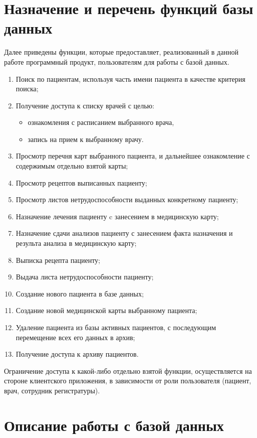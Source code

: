 \documentclass[14pt,a4paper,russian]{extreport}
\begin{document}
\section{Назначение и перечень функций базы данных}
Далее приведены функции, которые предоставляет, реализованный в данной работе программный продукт, пользователям для работы с базой данных.
\begin{enumerate}
	\item Поиск по пациентам, используя часть имени пациента в качестве критерия поиска;
	\item Получение доступа к списку врачей с целью:
		\begin{itemize}
				\renewcommand\labelitemi{--}
			\item ознакомления с расписанием выбранного врача,
			\item запись на прием к выбранному врачу.
		\end{itemize}
	\item Просмотр перечня карт выбранного пациента, и дальнейшее ознакомление с содержимым отдельно взятой карты;
	\item Просмотр рецептов выписанных пациенту;
	\item Просмотр листов нетрудоспособности выданных конкретному пациенту;
	\item Назначение лечения пациенту c занесением в медицинскую карту;
	\item Назначение сдачи анализов пациенту с занесением факта назначения и результа анализа в медицинскую карту;
	\item Выписка рецепта пациенту;
	\item Выдача листа нетрудоспособности пациенту;
	\item Создание нового пациента в базе данных;
	\item Создание новой медицинской карты выбранному пациента;
	\item Удаление пациента из базы активных пациентов, с последующим перемещение всех его данных в архив;
	\item Получение доступа к архиву пациентов.
\end{enumerate}
\cleardoublepage
Ограничение доступа к какой-либо отдельно взятой функции, осуществляется на стороне клиентского приложения, в зависимости от роли пользователя (пациент, врач, сотрудник регистратуры).

\section{Описание работы с базой данных}
\end{document}
